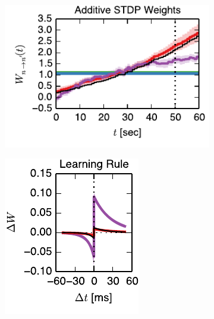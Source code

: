 \begin{figure}[t!]
\begin{subfigure}[T]{1.45in}
    \label{fig:fig3_static_pred_ll}
  \end{subfigure} \\
  \vspace{-1.5em}
  \begin{subfigure}[T]{2.4in}
    \flushleft
    \includegraphics[width=\textwidth]{figures/ch4/fig3_add_nothr_trajectory}    
    \label{fig:fig3_add_nothr_trajectory}
  \end{subfigure}
  \begin{subfigure}[T]{1.45in}
    \includegraphics[width=\textwidth]{figures/ch4/fig3_add_nothr_stdp_rule}    

\end{subfigure}
\end{figure}
